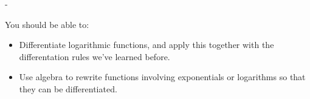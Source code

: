 \documentclass{article}
\makeatletter
\newlength{\tipmargin}
\renewenvironment{framed}{
  \setlength{\tipmargin}{\textwidth-\linewidth}
  \advance\@totalleftmargin-\tipmargin
  \def\FrameCommand{\hspace{\tipmargin}\fbox}%
  \advance\linewidth\tipmargin
  \MakeFramed {\advance\hsize-\width \FrameRestore}%
}
{\endMakeFramed}
\makeatother
\begin{document}

\begin{problemonly}
  \begin{framed}

You should be able to:
    \begin{itemize}[topsep=0pt,partopsep=0pt,parsep=8pt,itemsep=0pt]
    \item Differentiate logarithmic functions, and apply this together with the differentation rules we've learned before. 

    \item Use algebra to rewrite functions involving exponentials or logarithms so that they can be differentiated.

    \end{itemize}
  \end{framed}
\end{problemonly}
\end{document}
